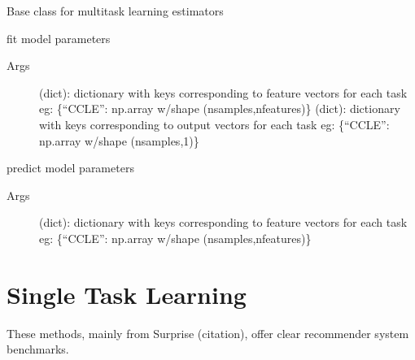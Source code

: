 \documentclass[letterpaper,10pt,english,openany,oneside]{sphinxmanual}
\begin{document}
\begin{fulllineitems}
\label{\detokenize{base:methods.base.BaseMTLEstimator}}
Base class for multitask learning estimators

\begin{fulllineitems}
\label{\detokenize{base:methods.base.BaseMTLEstimator.fit}}
fit model parameters
\begin{description}
\item[{Args}] \leavevmode
{} (dict):
dictionary with keys corresponding to feature vectors for each task eg: \{“CCLE”: np.array w/shape (nsamples,nfeatures)\}
 (dict):
dictionary with keys corresponding to output vectors for each task eg: \{“CCLE”: np.array w/shape (nsamples,1)\}

\end{description}

\end{fulllineitems}


\begin{fulllineitems}
\label{\detokenize{base:methods.base.BaseMTLEstimator.predict}}
predict model parameters
\begin{description}
\item[{Args}] \leavevmode
{} (dict):
dictionary with keys corresponding to feature vectors for each task eg: \{“CCLE”: np.array w/shape (nsamples,nfeatures)\}

\end{description}

\end{fulllineitems}


\end{fulllineitems}



\chapter{Single Task Learning}
\label{\detokenize{stl:single-task-learning}}\label{\detokenize{stl::doc}}
These methods, mainly from Surprise (citation), offer clear recommender system benchmarks.
\end{document}
